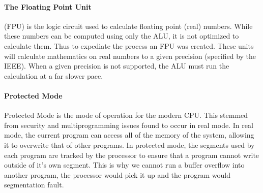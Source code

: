\documentclass[a4paper,11pt]{report}
\begin{document}
				\paragraph{The Floating Point Unit}
					(FPU) is the logic circuit used to calculate floating point (real) numbers. 
					While these numbers can be computed using only the ALU, it is not optimized to calculate them.
					Thus to expediate the process an FPU was created. 
					These units will calculate mathematics on real numbers to a given precision (specified by the IEEE). %
					When a given precision is not supported, the ALU must run the calculation at a far slower pace. 
				\paragraph{Protected Mode} 
					Protected Mode is the mode of operation for the modern CPU. 
					This stemmed from security and multiprogramming issues found to occur in real mode. 
					In real mode, the current program can access all of the memory of the system, allowing it to overwrite that of other programs. 
					In protected mode, the segments used by each program are tracked by the processor to ensure that a program cannot write outside of it's own segment. 
					This is why we cannot run a buffer overflow into another program, the processor would pick it up and the program would segmentation fault. 
\end{document}
